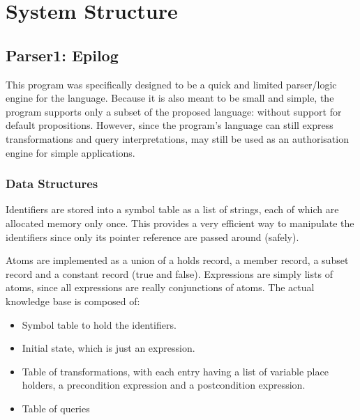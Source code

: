 \documentclass[a4paper,draft]{article}
\begin{document}
    \pagebreak

  \section{System Structure}

    \subsection{Parser1: Epilog}

      This program was specifically designed to be a quick and limited 
      parser/logic engine for the language. Because it is also meant to
      be small and simple, the program supports only a subset of the
      proposed language: without support for default propositions. However,
      since the program's language can still express transformations and query
      interpretations, may still be used as an authorisation engine for simple
      applications.

      \subsubsection{Data Structures}

        Identifiers are stored into a symbol table as a list of strings, each
        of which are allocated memory only once. This provides a very
        efficient way to manipulate the identifiers since only its pointer
        reference are passed around (safely).

        Atoms are implemented as a union of a holds record, a member record,
        a subset record and a constant record (true and false). Expressions
        are simply lists of atoms, since all expressions are really
        conjunctions of atoms. The actual knowledge base is composed of:

        \begin{itemize}
          \item
            Symbol table to hold the identifiers.
          \item
            Initial state, which is just an expression.
          \item
            Table of transformations, with each entry having a list of
            variable place holders, a precondition expression and a
            postcondition expression.
          \item
            Table of queries
        \end{itemize}
\end{document}
